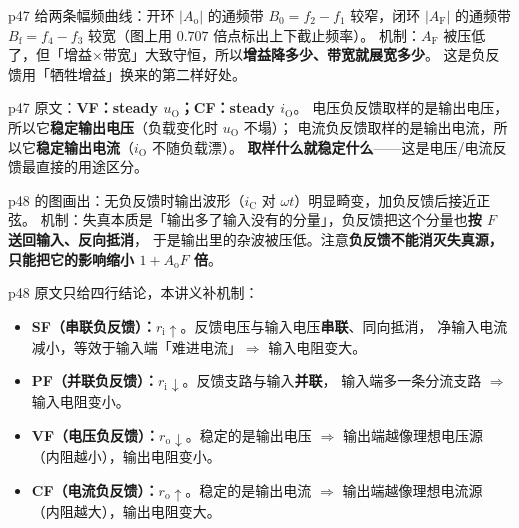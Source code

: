 \documentclass[11pt]{ctexart}
\begin{document}

p47 给两条幅频曲线：开环 $|A_{\mathrm{o}}|$ 的通频带 $B_0=f_2-f_1$ 较窄，闭环 $|A_{\mathrm{F}}|$
的通频带 $B_{\mathrm{f}}=f_4-f_3$ 较宽（图上用 $0.707$ 倍点标出上下截止频率）。
机制：$A_{\mathrm{F}}$ 被压低了，但「增益×带宽」大致守恒，所以\textbf{增益降多少、带宽就展宽多少}。
这是负反馈用「牺牲增益」换来的第二样好处。


p47 原文：\textbf{VF：steady $u_{\mathrm{O}}$；CF：steady $i_{\mathrm{O}}$}。
电压负反馈取样的是输出电压，所以它\textbf{稳定输出电压}（负载变化时 $u_{\mathrm{O}}$ 不塌）；
电流负反馈取样的是输出电流，所以它\textbf{稳定输出电流}（$i_{\mathrm{O}}$ 不随负载漂）。
\textbf{取样什么就稳定什么}——这是电压/电流反馈最直接的用途区分。


p48 的图画出：无负反馈时输出波形（$i_{\mathrm{C}}$ 对 $\omega t$）明显畸变，加负反馈后接近正弦。
机制：失真本质是「输出多了输入没有的分量」，负反馈把这个分量也\textbf{按 $F$ 送回输入、反向抵消}，
于是输出里的杂波被压低。注意\textbf{负反馈不能消灭失真源，只能把它的影响缩小 $1+A_{\mathrm{o}}F$ 倍}。


p48 原文只给四行结论，本讲义补机制：

\begin{itemize}
\item \textbf{SF（串联负反馈）：$r_{\mathrm{i}}\uparrow$}。反馈电压与输入电压\textbf{串联}、同向抵消，
净输入电流减小，等效于输入端「难进电流」$\Rightarrow$ 输入电阻变大。
\item \textbf{PF（并联负反馈）：$r_{\mathrm{i}}\downarrow$}。反馈支路与输入\textbf{并联}，
输入端多一条分流支路 $\Rightarrow$ 输入电阻变小。
\item \textbf{VF（电压负反馈）：$r_{\mathrm{o}}\downarrow$}。稳定的是输出电压 $\Rightarrow$ 输出端越像理想电压源
（内阻越小），输出电阻变小。
\item \textbf{CF（电流负反馈）：$r_{\mathrm{o}}\uparrow$}。稳定的是输出电流 $\Rightarrow$ 输出端越像理想电流源
（内阻越大），输出电阻变大。
\end{itemize}

\end{document}
